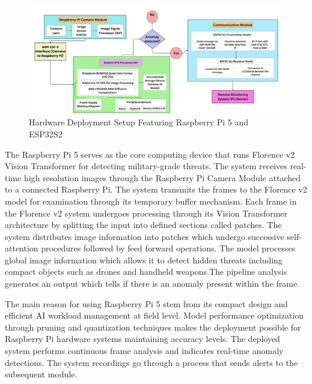 \documentclass[fleqn,10pt,lineno]{wlpeerj}
\begin{document}
\begin{figure} [H]
    \centering
    \includegraphics[width=1\linewidth]{hardware_architecture}
    \caption{Hardware Deployment Setup Featuring Raspberry Pi 5 and ESP32S2}
    \label{fig:hardware-deployment}
\end{figure}

The Raspberry Pi 5 serves as the core computing device that runs Florence v2 Vision Transformer for detecting military-grade threats. The system receives real-time high resolution images through the Raspberry Pi Camera Module attached to a connected Raspberry Pi. The system transmits the frames to the Florence v2 model for examination through its temporary buffer mechanism. Each frame in the Florence v2 system undergoes processing through its Vision Transformer architecture by splitting the input into defined sections called patches. The system distributes image information into patches which undergo successive self-attention procedures followed by feed forward operations. The model processes global image information which allows it to detect hidden threats including compact objects such as drones and handheld weapons.The pipeline analysis generates an output which tells if there is an anomaly present within the frame.

The main reason for using Raspberry Pi 5 stem from its compact design and efficient AI workload management at field level. Model performance optimization through pruning and quantization techniques makes the deployment possible for Raspberry Pi hardware systems maintaining accuracy levels. The deployed system performs continuous frame analysis and indicates real-time anomaly detections. The system recordings go through a process that sends alerts to the subsequent module. 
\end{document}
